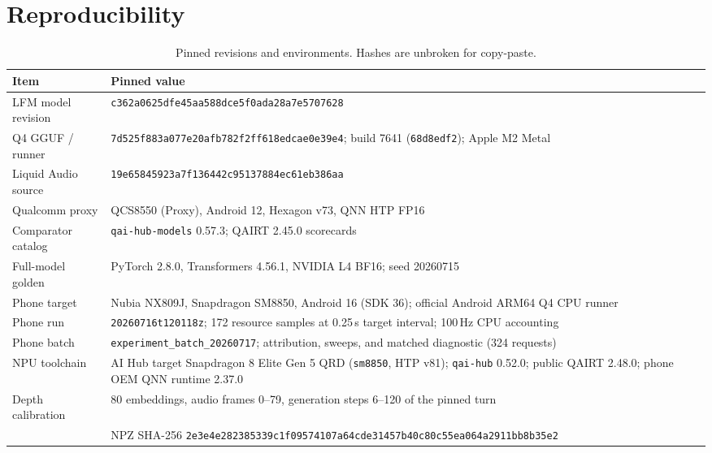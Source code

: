 \documentclass[10pt,twocolumn,letterpaper]{article}
\begin{document}
\section{Reproducibility}
\label{sec:repro}

\begin{table}[t]
\centering
\footnotesize
\caption{Pinned revisions and environments. Hashes are unbroken for
copy-paste.}
\label{tab:repro}
\begin{tabular}{@{}p{}p{}@{}}
\toprule
\textbf{Item} & \textbf{Pinned value} \\
\midrule
LFM model revision & \texttt{c362a0625dfe45aa588dce5f0ada28a7e5707628} \\
\addlinespace[2pt]
Q4 GGUF / runner & \texttt{7d525f883a077e20afb782f2ff618edcae0e39e4}; build 7641 (\texttt{68d8edf2}); Apple M2 Metal \\
\addlinespace[2pt]
Liquid Audio source & \texttt{19e65845923a7f136442c95137884ec61eb386aa} \\
\addlinespace[2pt]
Qualcomm proxy & QCS8550 (Proxy), Android 12, Hexagon v73, QNN HTP FP16 \\
\addlinespace[2pt]
Comparator catalog & \texttt{qai-hub-models} 0.57.3; QAIRT 2.45.0 scorecards \\
\addlinespace[2pt]
Full-model golden & PyTorch 2.8.0, Transformers 4.56.1, NVIDIA L4 BF16; seed 20260715 \\
\addlinespace[2pt]
Phone target & Nubia NX809J, Snapdragon SM8850, Android 16 (SDK 36); official Android ARM64 Q4 CPU runner \\
\addlinespace[2pt]
Phone run & \texttt{20260716t120118z}; 172 resource samples at 0.25\,s target interval; 100\,Hz CPU accounting \\
\addlinespace[2pt]
Phone batch & \texttt{experiment\_batch\_20260717}; attribution, sweeps, and matched diagnostic (324 requests) \\
\addlinespace[2pt]
NPU toolchain & AI Hub target Snapdragon 8 Elite Gen 5 QRD (\texttt{sm8850}, HTP v81); \texttt{qai-hub} 0.52.0; public QAIRT 2.48.0; phone OEM QNN runtime 2.37.0 \\
\addlinespace[2pt]
Depth calibration & 80 embeddings, audio frames 0--79, generation steps 6--120 of the pinned turn \\
 & NPZ SHA-256 \texttt{2e3e4e282385339c1f09574107a64cde31457b40c80c55ea064a2911bb8b35e2} \\
\bottomrule
\end{tabular}
\end{table}
\end{document}
